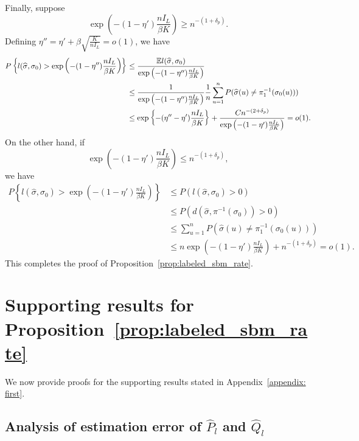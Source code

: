 \documentclass{article}
\begin{document}
Finally, suppose $$\exp\left( -(1 - \eta') \frac{n I_L}{\beta K} \right) \geq n^{-(1+\delta_p)}.$$
Defining $\eta'' = \eta' + \beta \sqrt{ \frac{K}{ n I_L} } = o(1)$, we have
\begin{align*}
P\left\{ l(\widehat{\sigma}, \sigma_0) >   \exp\left( -(1 - \eta'') \frac{n I_L}{\beta K} \right) \right\} & \leq \frac{{\mathbb E} l(\widehat \sigma, \sigma_0)}{ \exp\left( -(1 - \eta'') \frac{n I_L}{\beta K} \right)}\\
 & \le \frac{1}{ \exp\left( -(1 - \eta'') \frac{n I_L}{\beta K} \right) } \frac{1}{n} \sum_{u=1}^n P(\widehat{\sigma}(u) \neq \pi_1^{-1}(\sigma_0(u))) \\
 &\leq \exp\left\{ -(\eta'' - \eta') \frac{n I_L}{\beta K} \right\} + \frac{ C n^{-(2 + \delta_p)} }{ \exp\left( -(1 - \eta') \frac{n I_L}{\beta K} \right)  } = o(1).
\end{align*}
On the other hand, if
$$ \exp\left( -(1 - \eta') \frac{n I_L}{\beta K} \right) \leq n^{-(1 + \delta_p)},$$
we have
\begin{align*}
P \left\{ l(\hat{\sigma}, \sigma_0) >  \exp\left( -(1 - \eta') \frac{n I_L}{\beta K} \right)  \right\} & \leq P( l(\hat{\sigma}, \sigma_0) > 0 ) \\
%
& \le P(d(\hat{\sigma}, \pi^{-1}(\sigma_0)) > 0) \\
& \leq \sum_{u=1}^n P( \hat{\sigma}(u) \neq \pi_1^{-1}(\sigma_0(u))) \\
&\leq n \exp\left( -(1 - \eta') \frac{n I_L}{\beta K} \right)  + n^{-(1+\delta_p)} = o(1).
\end{align*}
This completes the proof of Proposition~\ref{prop:labeled_sbm_rate}.


\section{Supporting results for Proposition~\ref{prop:labeled_sbm_rate}}
\label{appendix: labeled_sbm_rate}

We now provide proofs for the supporting results stated in Appendix~\ref{appendix: first}.

\subsection{Analysis of estimation error of $\hat{P}_l$ and $\hat{Q}_l$}
\label{appendix: hats galore}
\end{document}
